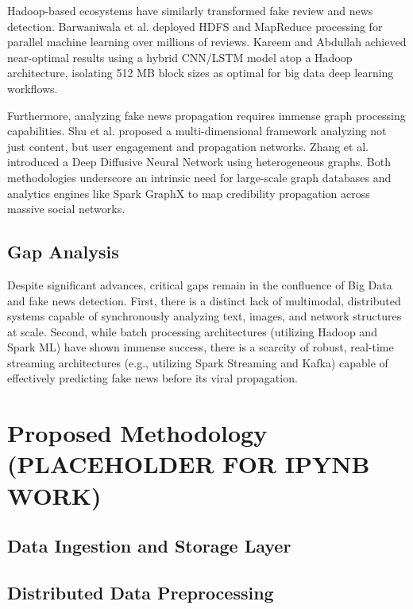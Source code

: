 \documentclass[conference]{IEEEtran}
\begin{document}
Hadoop-based ecosystems have similarly transformed fake review and news detection. Barwaniwala et al. deployed HDFS and MapReduce processing for parallel machine learning over millions of reviews. Kareem and Abdullah achieved near-optimal results using a hybrid CNN/LSTM model atop a Hadoop architecture, isolating 512 MB block sizes as optimal for big data deep learning workflows.

Furthermore, analyzing fake news propagation requires immense graph processing capabilities. Shu et al. proposed a multi-dimensional framework analyzing not just content, but user engagement and propagation networks. Zhang et al. introduced a Deep Diffusive Neural Network using heterogeneous graphs. Both methodologies underscore an intrinsic need for large-scale graph databases and analytics engines like Spark GraphX to map credibility propagation across massive social networks.

\subsection{Gap Analysis}
Despite significant advances, critical gaps remain in the confluence of Big Data and fake news detection. First, there is a distinct lack of multimodal, distributed systems capable of synchronously analyzing text, images, and network structures at scale. Second, while batch processing architectures (utilizing Hadoop and Spark ML) have shown immense success, there is a scarcity of robust, real-time streaming architectures (e.g., utilizing Spark Streaming and Kafka) capable of effectively predicting fake news before its viral propagation.

\section[Proposed Methodology]{Proposed Methodology (PLACEHOLDER FOR IPYNB WORK)}
\subsection{Data Ingestion and Storage Layer}

\subsection{Distributed Data Preprocessing}
\end{document}
